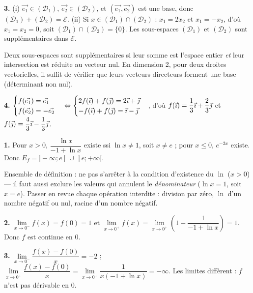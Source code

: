 \documentclass[11pt]{article}
\begin{document}
\textbf{3.} (i) $\vec{e_1} \in (\mathcal{D}_1)$, $\vec{e_2} \in (\mathcal{D}_2)$, et $(\vec{e_1}, \vec{e_2})$ est une base, donc $(\mathcal{D}_1) + (\mathcal{D}_2) = \mathscr{E}$. (ii) Si $x \in (\mathcal{D}_1)\cap(\mathcal{D}_2)$ : $x_1 = 2x_2$ et $x_1 = -x_2$, d'où $x_1 = x_2 = 0$, soit $(\mathcal{D}_1)\cap(\mathcal{D}_2) = \{0\}$. Les sous-espaces $(\mathcal{D}_1)$ et $(\mathcal{D}_2)$ sont supplémentaires dans $\mathscr{E}$.

\begin{methode}
Deux sous-espaces sont supplémentaires si leur somme est l'espace
entier \emph{et} leur intersection est réduite au vecteur nul. En
dimension 2, pour deux droites vectorielles, il suffit de vérifier que
leurs vecteurs directeurs forment une base (déterminant non nul).
\end{methode}

\textbf{4.} $\begin{cases} f(\vec{e_1}) = \vec{e_1} \\ f(\vec{e_2}) = -\vec{e_2} \end{cases} \Leftrightarrow \begin{cases} 2f(\vec{\imath}) + f(\vec{\jmath}) = 2\vec{\imath} + \vec{\jmath} \\ -f(\vec{\imath}) + f(\vec{\jmath}) = \vec{\imath} - \vec{\jmath} \end{cases}$, d'où $f(\vec{\imath}) = \dfrac{1}{3}\vec{\imath} + \dfrac{2}{3}\vec{\jmath}$ et $f(\vec{\jmath}) = \dfrac{4}{3}\vec{\imath} - \dfrac{1}{3}\vec{\jmath}$.

\textbf{1.} Pour $x > 0$, $\dfrac{\ln x}{-1 + \ln x}$ existe ssi $\ln x \ne 1$, soit $x \ne e$ ; pour $x \le 0$, $e^{-2x}$ existe. Donc $E_f = ]-\infty;e[\,\cup\,]e;+\infty[$.

\begin{piege}
Ensemble de définition : ne pas s'arrêter à la condition d'existence du
$\ln$ ($x > 0$) — il faut aussi exclure les valeurs qui annulent le
\emph{dénominateur} ($\ln x = 1$, soit $x = e$). Passer en revue chaque
opération interdite : division par zéro, $\ln$ d'un nombre négatif ou
nul, racine d'un nombre négatif.
\end{piege}

\textbf{2.} $\lim\limits_{x\to 0^-} f(x) = f(0) = 1$ et $\lim\limits_{x\to 0^+} f(x) = \lim\limits_{x\to 0^+}\left(1 + \dfrac{1}{-1+\ln x}\right) = 1$. Donc $f$ est continue en 0.

\textbf{3.} $\lim\limits_{x\to 0^-}\dfrac{f(x)-f(0)}{x} = -2$ ; $\lim\limits_{x\to 0^+}\dfrac{f(x)-f(0)}{x} = \lim\limits_{x\to 0^+}\dfrac{1}{x(-1+\ln x)} = -\infty$. Les limites diffèrent : $f$ n'est pas dérivable en 0.
\end{document}

